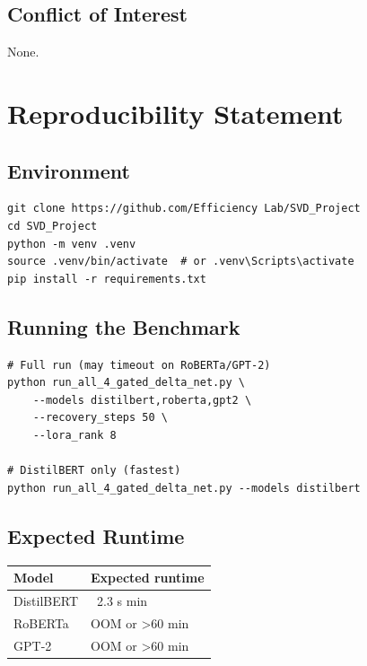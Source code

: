 \subsection{Conflict of Interest}

None.




\section{Reproducibility Statement}

\subsection{Environment}

\begin{lstlisting}
git clone https://github.com/Efficiency Lab/SVD_Project
cd SVD_Project
python -m venv .venv
source .venv/bin/activate  # or .venv\Scripts\activate
pip install -r requirements.txt
\end{lstlisting}

\subsection{Running the Benchmark}

\begin{lstlisting}
# Full run (may timeout on RoBERTa/GPT-2)
python run_all_4_gated_delta_net.py \
    --models distilbert,roberta,gpt2 \
    --recovery_steps 50 \
    --lora_rank 8

# DistilBERT only (fastest)
python run_all_4_gated_delta_net.py --models distilbert
\end{lstlisting}

\subsection{Expected Runtime}

\begin{table}[H]
\centering
\small
\begin{tabular}{ll}
\toprule
\textbf{Model} & \textbf{Expected runtime} \\
\midrule
DistilBERT & ~2.3 s min \\
RoBERTa & OOM or >60 min \\
GPT-2 & OOM or >60 min \\
\bottomrule
\end{tabular}
\end{table}


